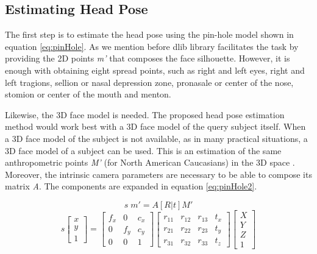 \documentclass{sig-alternate}
\begin{document}
\subsection{Estimating Head Pose}
The first step is to estimate the head pose using the pin-hole model shown in equation \ref{eq:pinHole}. As we mention before dlib library facilitates the task by providing the 2D points \textit{m'} that composes the face silhouette. However, it is enough with obtaining eight spread points, such as right and left eyes, right and left tragions, sellion or nasal depression zone, pronasale or center of the nose, stomion or center of the mouth and menton.

\newpage
Likewise, the 3D face model is needed. The proposed head pose estimation method would work best with a 3D face model of the query subject itself. When a 3D face model of the subject is not available, as in many practical situations, a 3D face model of a subject can be used. This is an estimation of the same anthropometric points \textit{M'} (for North American Caucasians) in the 3D space \cite{farkas1994anthropometry}. Moreover, the intrinsic camera parameters are necessary to be able to compose its matrix \textit{A}. The components are expanded in equation \ref{eq:pinHole2}.	

\begin{equation}
s  \; m' = A [R|t] M'
\label{eq:pinHole}
\end{equation}
\begin{equation}
s
\begin{bmatrix}
x \\
y \\
1
\end{bmatrix}
=
\begin{bmatrix}
f_x & 0 & c_x  \\
0 & f_y & c_y  \\
0 & 0 & 1 
\end{bmatrix}
\begin{bmatrix}
r_{11} & r_{12} & r_{13} & t_x  \\
r_{21} & r_{22} & r_{23} & t_y  \\
r_{31} & r_{32} & r_{33} & t_z  
\end{bmatrix}
\begin{bmatrix}
X \\
Y \\
Z \\
1
\end{bmatrix}
\label{eq:pinHole2}
\end{equation}
\end{document}
